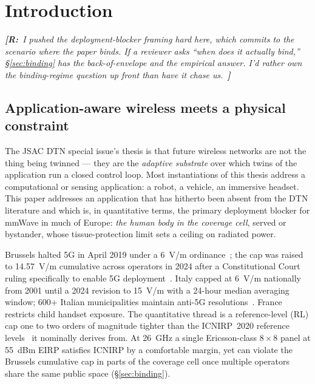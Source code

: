 \documentclass[journal,twocolumn,10pt]{IEEEtran}
\theoremstyle{definition}
\newcommand{\robinnote}[1]{%
  {\color{red!75!black}\textit{\textbf{[R:}~#1~\textbf{]}}}}
\begin{document}
\section{Introduction}\label{sec:intro}

\robinnote{I pushed the deployment-blocker framing hard here, which
commits to the scenario where the paper binds. If a reviewer asks
``when does it actually bind,'' \S\ref{sec:binding} has the
back-of-envelope and the empirical answer. I'd rather own the
binding-regime question up front than have it chase us.}

\subsection{Application-aware wireless meets a physical constraint}

The JSAC DTN special issue's thesis is that future wireless
networks are not the thing being twinned --- they are the
\emph{adaptive substrate} over which twins of the application
run a closed control loop. Most instantiations of this thesis
address a computational or sensing application: a robot, a
vehicle, an immersive headset. This paper addresses an
application that has hitherto been absent from the DTN literature
and which is, in quantitative terms, the primary deployment
blocker for mmWave in much of Europe: \emph{the human body in the
coverage cell}, served or bystander, whose tissue-protection
limit sets a ceiling on radiated power.

Brussels halted 5G in April 2019 under a 6~V/m
ordinance~\cite{BrusselsArrete2007}; the cap was raised to
14.57~V/m cumulative across operators in 2024 after a
Constitutional Court ruling specifically to enable 5G
deployment~\cite{BrusselsArrete2024}. Italy capped at 6~V/m
nationally from 2001 until a 2024 revision to 15~V/m with a
24-hour median averaging window; 600+ Italian municipalities
maintain anti-5G resolutions~\cite{ItalyCap}. France restricts
child handset exposure. The quantitative thread is a
reference-level (RL) cap one to two orders of magnitude tighter
than the ICNIRP~2020 reference levels~\cite{ICNIRP2020} it nominally
derives from. At 26~GHz a single Ericsson-class $8\times 8$ panel
at 55~dBm EIRP satisfies ICNIRP by a comfortable margin, yet can
violate the Brussels cumulative cap in parts of the coverage cell
once multiple operators share the same public space
(\S\ref{sec:binding}).
\end{document}
